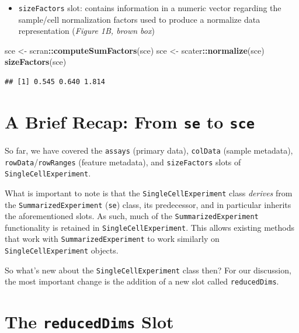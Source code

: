 \documentclass[]{book}
\newenvironment{Shaded}{\begin{snugshade}}{\end{snugshade}}
\newcommand{\KeywordTok}[1]{\textcolor[rgb]{0.13,0.29,0.53}{\textbf{#1}}}
\newcommand{\NormalTok}[1]{#1}
\newcommand{\OperatorTok}[1]{\textcolor[rgb]{0.81,0.36,0.00}{\textbf{#1}}}
\newcommand{\StringTok}[1]{\textcolor[rgb]{0.31,0.60,0.02}{#1}}
\providecommand{\tightlist}{%
  \setlength{\itemsep}{0pt}\setlength{\parskip}{0pt}}
\begin{document}
\begin{itemize}
\tightlist
\item
  \texttt{sizeFactors} slot: contains information in a numeric vector regarding the sample/cell normalization factors used to produce a normalize data representation (\emph{Figure 1B, brown box})
\end{itemize}

\begin{Shaded}
\begin{Highlighting}[]
\NormalTok{sce <-}\StringTok{ }\NormalTok{scran}\OperatorTok{::}\KeywordTok{computeSumFactors}\NormalTok{(sce)}
\NormalTok{sce <-}\StringTok{ }\NormalTok{scater}\OperatorTok{::}\KeywordTok{normalize}\NormalTok{(sce)}
\KeywordTok{sizeFactors}\NormalTok{(sce)}
\end{Highlighting}
\end{Shaded}

\begin{verbatim}
## [1] 0.545 0.640 1.814
\end{verbatim}

\hypertarget{a-brief-recap-from-se-to-sce}{%
\section{\texorpdfstring{A Brief Recap: From \texttt{se} to \texttt{sce}}{A Brief Recap: From se to sce}}\label{a-brief-recap-from-se-to-sce}}

So far, we have covered the \texttt{assays} (primary data), \texttt{colData} (sample metadata), \texttt{rowData}/\texttt{rowRanges} (feature metadata), and \texttt{sizeFactors} slots of \texttt{SingleCellExperiment}.

What is important to note is that the \texttt{SingleCellExperiment} class \emph{derives} from the \texttt{SummarizedExperiment} (\texttt{se}) class, its predecessor, and in particular inherits the aforementioned slots. As such, much of the \texttt{SummarizedExperiment} functionality is retained in \texttt{SingleCellExperiment}. This allows existing methods that work with \texttt{SummarizedExperiment} to work similarly on \texttt{SingleCellExperiment} objects.

So what's new about the \texttt{SingleCellExperiment} class then? For our discussion, the most important change is the addition of a new slot called \texttt{reducedDims}.

\hypertarget{the-reduceddims-slot}{%
\section{\texorpdfstring{The \texttt{reducedDims} Slot}{The reducedDims Slot}}\label{the-reduceddims-slot}}
\end{document}
